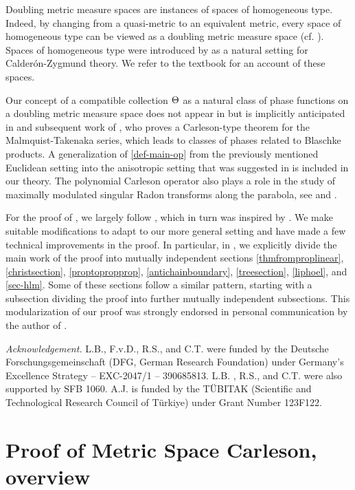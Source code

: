 Doubling metric measure spaces are instances of spaces of homogeneous type. Indeed, by changing from a quasi-metric to an equivalent metric, every space of homogeneous type can be viewed as a doubling metric measure space (cf. \cite{MaciasSegovia}). Spaces of homogeneous type were introduced by \cite{MR0499948} as a natural setting for Calder\'on-Zygmund theory. We refer to the textbook \cite{stein-book} for an account of these spaces.

Our concept of a compatible collection ${\Theta}$ as a natural class of phase functions on a doubling metric measure space does not appear in \cite{stein-book} but is implicitly anticipated in \cite{zk-polynomial} and subsequent work of \cite{mnatsakanyan}, who proves a Carleson-type theorem for the Malmquist-Takenaka series, which leads to classes of phases related to Blaschke products. A generalization of \eqref{def-main-op} from the previously mentioned Euclidean setting into the anisotropic setting that was suggested in \cite{zk-polynomial} is included in our theory. The polynomial Carleson operator also plays a role in the study of maximally modulated singular Radon transforms along the parabola, see \cite{ramos} and \cite{becker2024maximal}.

For the proof of , we largely follow \cite{zk-polynomial}, which in turn was inspired by \cite{lie-polynomial}. We make suitable modifications to adapt to our more general setting and have made a few technical improvements in the proof. In particular, in , we explicitly divide the main work of the proof into mutually independent sections \ref{thmfromproplinear}, \ref{christsection}, \ref{proptopropprop}, \ref{antichainboundary}, \ref{treesection}, \ref{liphoel}, and \ref{sec-hlm}. Some of these sections follow a similar pattern, starting with a subsection dividing the proof into further mutually independent subsections. This modularization of our proof was strongly endorsed in personal communication by the author of \cite{zk-polynomial}.

\noindent \textit{Acknowledgement.}
L.B., F.v.D., R.S., and C.T. were funded by the Deutsche Forschungsgemeinschaft (DFG, German Research Foundation) under Germany's Excellence Strategy -- EXC-2047/1 -- 390685813.
L.B. , R.S., and C.T. were also supported by SFB 1060.
A.J. is funded by the T\"UBITAK (Scientific and Technological Research Council of T\"urkiye) under Grant Number 123F122.

\chapter{Proof of Metric Space Carleson, overview}
\label{overviewsection}


